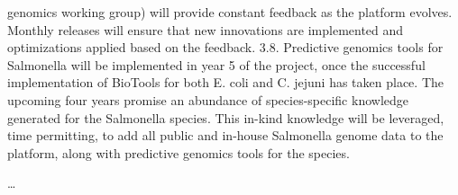 \documentclass{bmcart}
\begin{document}
genomics working group) will provide constant feedback as the platform evolves. Monthly
releases will ensure that new innovations are implemented and optimizations applied based on
the feedback.
3.8. Predictive genomics tools for Salmonella will be implemented in year 5 of the project, once the
successful implementation of BioTools for both E. coli and C. jejuni has taken place. The
upcoming four years promise an abundance of species-specific knowledge generated for the
Salmonella species. This in-kind knowledge will be leveraged, time permitting, to add all
public and in-house Salmonella genome data to the platform, along with predictive genomics
tools for the species.

\ldots
\end{document}

